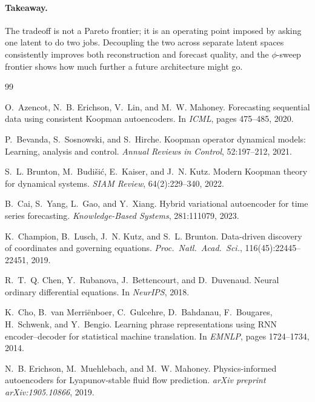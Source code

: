 \documentclass{article}
\begin{document}
\paragraph{Takeaway.}
The tradeoff is not a Pareto frontier; it is an operating point imposed by
asking one latent to do two jobs.  Decoupling the two across separate latent
spaces consistently improves both reconstruction and forecast quality, and the
$\phi$-sweep frontier shows how much further a future architecture might go.


\begin{thebibliography}{99}

O.~Azencot, N.~B. Erichson, V.~Lin, and M.~W. Mahoney.
\newblock Forecasting sequential data using consistent Koopman autoencoders.
\newblock In \emph{ICML}, pages 475--485, 2020.

P.~Bevanda, S.~Sosnowski, and S.~Hirche.
\newblock Koopman operator dynamical models: Learning, analysis and control.
\newblock \emph{Annual Reviews in Control}, 52:197--212, 2021.

S.~L. Brunton, M.~Budi\v{s}i\'{c}, E.~Kaiser, and J.~N. Kutz.
\newblock Modern {K}oopman theory for dynamical systems.
\newblock \emph{SIAM Review}, 64(2):229--340, 2022.

B.~Cai, S.~Yang, L.~Gao, and Y.~Xiang.
\newblock Hybrid variational autoencoder for time series forecasting.
\newblock \emph{Knowledge-Based Systems}, 281:111079, 2023.

K.~Champion, B.~Lusch, J.~N. Kutz, and S.~L. Brunton.
\newblock Data-driven discovery of coordinates and governing equations.
\newblock \emph{Proc.\ Natl.\ Acad.\ Sci.}, 116(45):22445--22451, 2019.

R.~T.~Q. Chen, Y.~Rubanova, J.~Bettencourt, and D.~Duvenaud.
\newblock Neural ordinary differential equations.
\newblock In \emph{NeurIPS}, 2018.

K.~Cho, B.~van Merri\"{e}nboer, C.~Gulcehre, D.~Bahdanau, F.~Bougares,
  H.~Schwenk, and Y.~Bengio.
\newblock Learning phrase representations using {RNN} encoder--decoder for
  statistical machine translation.
\newblock In \emph{EMNLP}, pages 1724--1734, 2014.

N.~B. Erichson, M.~Muehlebach, and M.~W. Mahoney.
\newblock Physics-informed autoencoders for Lyapunov-stable fluid flow
  prediction.
\newblock \emph{arXiv preprint arXiv:1905.10866}, 2019.


\end{thebibliography}
\end{document}
